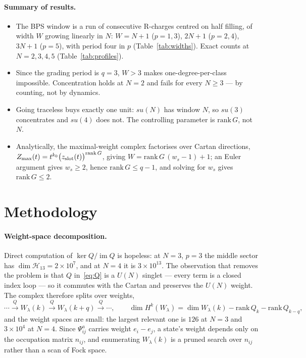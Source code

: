 \documentclass[10pt]{article}
\newcommand{\rank}{\mathrm{rank}\,}
\begin{document}
\paragraph{Summary of results.}
\begin{itemize}
\item The BPS window is a run of consecutive R-charges centred on half filling, of width $W$ growing linearly in $N$: $W=N+1$ ($p=1,3$), $2N+1$ ($p=2,4$), $3N+1$ ($p=5$), with period four in $p$ (Table~\ref{tab:widths}). Exact counts at $N=2,3,4,5$ (Table~\ref{tab:profiles}).
\item Since the grading period is $q=3$, $W>3$ makes one-degree-per-class impossible. Concentration holds at $N=2$ and fails for every $N\ge3$ --- by counting, not by dynamics.
\item Going traceless buys exactly one unit: $su(N)$ has window $N$, so $su(3)$ concentrates and $su(4)$ does not. The controlling parameter is $\rank G$, not $N$.
\item Analytically, the maximal-weight complex factorises over Cartan directions, $Z_{\max}(t)=t^{k_0}\big(z_{\rm slot}(t)\big)^{\rank G}$, giving $W=\rank G\,(w_s-1)+1$; an Euler argument gives $w_s\ge2$, hence $\rank G\le q-1$, and solving for $w_s$ gives $\rank G\le2$.
\end{itemize}

\section{Methodology}

\paragraph{Weight-space decomposition.}
Direct computation of $\ker Q/\operatorname{im}Q$ is hopeless: at $N=3$, $p=3$ the middle sector has $\dim\mathcal H_{13}=2\times10^7$, and at $N=4$ it is $3\times10^{13}$. The observation that removes the problem is that $Q$ in~\eqref{eq:Q} is a $U(N)$ singlet --- every term is a closed index loop --- so it commutes with the Cartan and preserves the $U(N)$ weight. The complex therefore splits over weights,
\begin{equation}
\cdots\xrightarrow{\ Q\ }W_\lambda(k)\xrightarrow{\ Q\ }W_\lambda(k+q)\xrightarrow{\ Q\ }\cdots,\qquad
\dim H^k(W_\lambda)=\dim W_\lambda(k)-\rank Q_k-\rank Q_{k-q},
\label{eq:weightsplit}
\end{equation}
and the weight spaces are small: the largest relevant one is $126$ at $N=3$ and $3\times10^4$ at $N=4$. Since $\Psi^a_{ij}$ carries weight $e_i-e_j$, a state's weight depends only on the occupation matrix $n_{ij}$, and enumerating $W_\lambda(k)$ is a pruned search over $n_{ij}$ rather than a scan of Fock space.
\end{document}

